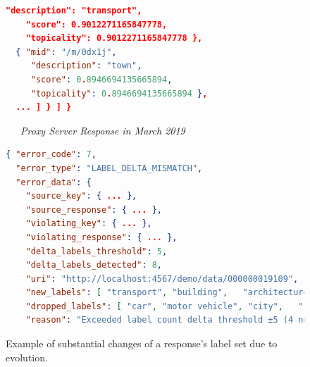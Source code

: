 \begin{figure}
\begin{framed}
\begin{minipage}{\linewidth}
\begin{lstlisting}[language=json]
    "description": "transport",
    "score": 0.9012271165847778,
    "topicality": 0.9012271165847778 },
  { "mid": "/m/0dx1j",
     "description": "town",
     "score": 0.8946694135665894,
     "topicality": 0.8946694135665894 },
  ... ] } ] }
        \end{lstlisting}
    \end{minipage}
    \begin{minipage}{\linewidth}
        \centering
        \noindent\xrfill[0.45ex]{.5pt}~~~\textit{Proxy Server Response in March 2019}~~~\xrfill[0.45ex]{.5pt}
        \begin{lstlisting}[language=json]
{ "error_code": 7,
  "error_type": "LABEL_DELTA_MISMATCH",
  "error_data": {
    "source_key": { ... },
    "source_response": { ... },
    "violating_key": { ... },
    "violating_response": { ... },
    "delta_labels_threshold": 5,
    "delta_labels_detected": 8,
    "uri": "http://localhost:4567/demo/data/000000019109",
    "new_labels": [ "transport", "building",   "architecture", "house" ],
    "dropped_labels": [ "car", "motor vehicle", "city",   "road" ],
    "reason": "Exceeded label count delta threshold ±5 (4 new labels + 4 dropped labels = 8)." } }
        \end{lstlisting}
    \end{minipage}
    \end{framed}
    \caption[Architecture response to label set evolution]{Example of substantial changes of a response's label set due to evolution.}
    \label{fig:example-label-delta}
\end{figure}
